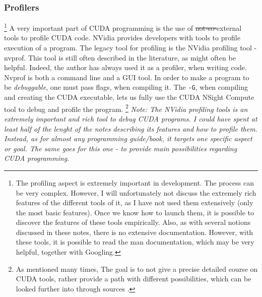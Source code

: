 \subsubsection{Profilers}
\footnote{The profiling aspect is extremely important in development. The process can be very complex.
However, I will unfortunately not discuss the extremely rich features of the different tools of it, as I have not used them extensively (only the most basic features).
Once we know how to launch them, it is possible to discover the features of these tools empirically. Also, as with several notions discussed in these notes,
there is no extensive documentation. However, with these tools, it is possible to read the {\selectfont man} documentation, which may be very helpful, together with Googling.}
A very important part of CUDA programming is the use of \sout{not-so-}external tools to profile CUDA code. NVidia provides 
developers with tools to profile execution of a program. The legacy tool for profiling is the NVidia profiling tool - nvprof.
This tool is still often described in the literature, as might often be helpful. Indeed, the author has always used it as a profiler, when writing 
code. Nvprof is both a command line and a GUI tool. In order to make a program to be \textit{debuggable}, one must pass flags, when compiling it. 
The \verb|-G|, when compiling and creating the CUDA executable, lets us fully use the CUDA NSight Compute tool to debug and profile the program. 
\footnote{As mentioned many times, The goal is to not give a precise detailed course on CUDA tools, rather provide a path with different possibilities, which can be looked further into through sources \cite{nsight_cern}.}
\textit{Note: The NVidia profiling tools is an extremely important and rich tool to debug CUDA programs. I could have spent at least half of the 
lenght of the notes describing its features and how to profile them. Instead, as for almost any programming guide/book, it targets one specific aspect or goal. 
The same goes for this one - to provide main possibilities regarding CUDA programming}.







